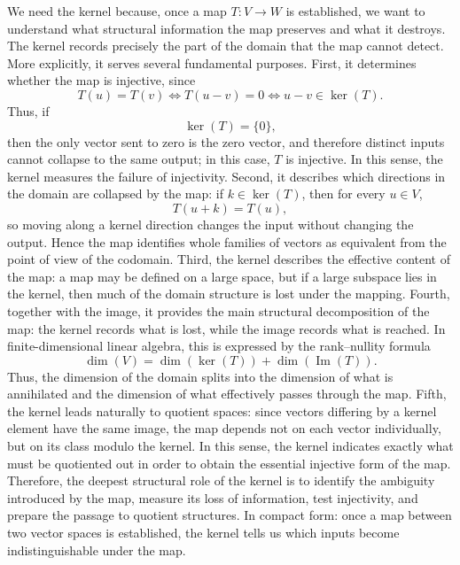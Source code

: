 \documentclass[12pt]{article}
\begin{document}
	We need the kernel because, once a map \(T:V\to W\) is established, we want to understand what structural information the map preserves and what it destroys. The kernel records precisely the part of the domain that the map cannot detect. More explicitly, it serves several fundamental purposes. First, it determines whether the map is injective, since
	\[
	T(u)=T(v)\iff T(u-v)=0\iff u-v\in\ker(T).
	\]
	Thus, if
	\[
	\ker(T)=\{0\},
	\]
	then the only vector sent to zero is the zero vector, and therefore distinct inputs cannot collapse to the same output; in this case, \(T\) is injective. In this sense, the kernel measures the failure of injectivity. Second, it describes which directions in the domain are collapsed by the map: if \(k\in\ker(T)\), then for every \(u\in V\),
	\[
	T(u+k)=T(u),
	\]
	so moving along a kernel direction changes the input without changing the output. Hence the map identifies whole families of vectors as equivalent from the point of view of the codomain. Third, the kernel describes the effective content of the map: a map may be defined on a large space, but if a large subspace lies in the kernel, then much of the domain structure is lost under the mapping. Fourth, together with the image, it provides the main structural decomposition of the map: the kernel records what is lost, while the image records what is reached. In finite-dimensional linear algebra, this is expressed by the rank--nullity formula
	\[
	\dim(V)=\dim(\ker(T))+\dim(\operatorname{Im}(T)).
	\]
	Thus, the dimension of the domain splits into the dimension of what is annihilated and the dimension of what effectively passes through the map. Fifth, the kernel leads naturally to quotient spaces: since vectors differing by a kernel element have the same image, the map depends not on each vector individually, but on its class modulo the kernel. In this sense, the kernel indicates exactly what must be quotiented out in order to obtain the essential injective form of the map. Therefore, the deepest structural role of the kernel is to identify the ambiguity introduced by the map, measure its loss of information, test injectivity, and prepare the passage to quotient structures. In compact form: once a map between two vector spaces is established, the kernel tells us which inputs become indistinguishable under the map.
	
\end{document}
